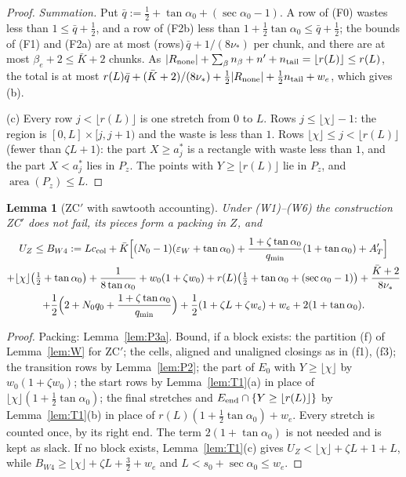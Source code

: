\documentclass[11pt]{amsart}
\newcommand{\taz}{\tan\alpha_0}
\newcommand{\sez}{\sec\alpha_0}
\newcommand{\Kb}{\bar K}
\newtheorem{lemma}[theorem]{Lemma}
\theoremstyle{definition}
\theoremstyle{remark}
\numberwithin{equation}{section}
\begin{document}
\begin{proof}
\emph{Summation.} Put $\bar q:=\frac12+\taz+(\sez-1)$. A row of (F0) wastes less than $1\le\bar q+\frac12$, and a row of
(F2b) less than $1+\frac12\taz\le\bar q+\frac12$; the bounds of (F1) and (F2a) are at most (rows)$\,\bar q+1/(8\nu_*)$ per
chunk, and there are at most $\beta_e+2\le\Kb+2$ chunks. As
$|R_{\rm none}|+\sum_\beta n_\beta+n'+n_{\rm tail}=\lfloor r(L)\rfloor\le r(L)$, the total is at most
$r(L)\bar q+(\Kb+2)/(8\nu_*)+\frac12|R_{\rm none}|+\frac12n_{\rm tail}+w_e$, which gives (b).

(c) Every row $j<\lfloor r(L)\rfloor$ is one stretch from $0$ to $L$. Rows $j\le\lfloor\chi\rfloor-1$: the region is
$[0,L]\times[j,j+1)$ and the waste is less than $1$. Rows $\lfloor\chi\rfloor\le j<\lfloor r(L)\rfloor$ (fewer than
$\zeta L+1$): the part $X\ge a_j^*$ is a rectangle with waste less than $1$, and the part $X<a_j^*$ lies in $P_z$. The
points with $Y\ge\lfloor r(L)\rfloor$ lie in $P_z$, and $\operatorname{area}(P_z)\le L$.
\end{proof}

\begin{lemma}[ZC$'$ with sawtooth accounting]\label{lem:W4}
Under (W1)--(W6) the construction ZC$'$ does not fail, its pieces form a packing in $Z$, and
\begin{multline*}
U_Z\le B_{W4}:=Lc_{\rm col}+\Kb\Bigl[(N_0-1)(\varepsilon_W+\taz)+\frac{1+\zeta\taz}{q_{\min}}(1+\taz)+A_T'\Bigr]\\
+\lfloor\chi\rfloor\bigl(\tfrac12+\taz\bigr)+\frac1{8\taz}+w_0(1+\zeta w_0)+r(L)\bigl(\tfrac12+\taz+(\sez-1)\bigr)+\frac{\Kb+2}{8\nu_*}\\
+\frac12\Bigl(2+N_0q_0+\frac{1+\zeta\taz}{q_{\min}}\Bigr)+\frac12(1+\zeta L+\zeta w_e)+w_e+2(1+\taz).
\end{multline*}
\end{lemma}

\begin{proof}
Packing: Lemma~\ref{lem:P3a}. Bound, if a block exists: the partition (f) of Lemma~\ref{lem:W} for ZC$'$; the cells,
aligned and unaligned closings as in (f1), (f3); the transition rows by Lemma~\ref{lem:P2}; the part of $E_0$ with
$Y\ge\lfloor\chi\rfloor$ by $w_0(1+\zeta w_0)$; the start rows by Lemma~\ref{lem:T1}(a) in place of
$\lfloor\chi\rfloor(1+\frac12\taz)$; the final stretches and $E_{\rm end}\cap\{Y\ge\lfloor r(L)\rfloor\}$ by
Lemma~\ref{lem:T1}(b) in place of $r(L)(1+\frac12\taz)+w_e$. Every stretch is counted once, by its right end. The term
$2(1+\taz)$ is not needed and is kept as slack. If no block exists, Lemma~\ref{lem:T1}(c) gives
$U_Z<\lfloor\chi\rfloor+\zeta L+1+L$, while $B_{W4}\ge\lfloor\chi\rfloor+\zeta L+\frac32+w_e$ and $L<s_0+\sez\le w_e$.
\end{proof}
\end{document}
